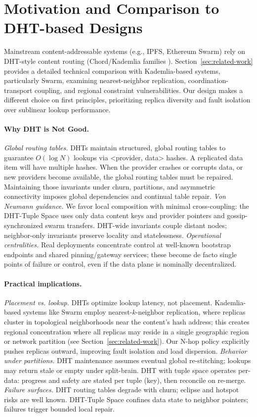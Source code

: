 \documentclass[runningheads]{llncs}
\begin{document}
\section{Motivation and Comparison to DHT-based Designs}
Mainstream content-addressable systems (e.g., IPFS, Ethereum Swarm) rely on DHT-style content routing (Chord/Kademlia families \cite{StoicaChord01}). Section~\ref{sec:related-work} provides a detailed technical comparison with Kademlia-based systems, particularly Swarm, examining nearest-neighbor replication, coordination-transport coupling, and regional constraint vulnerabilities. Our design makes a different choice on first principles, prioritizing replica diversity and fault isolation over sublinear lookup performance.

\paragraph{Why DHT is Not Good.}
\emph{Global routing tables.} DHTs maintain structured, global routing tables to guarantee $O(\log N)$ lookups via <provider, data> hashes. A replicated data item will have multiple hashes. When the provider crashes or corrupts data, or new providers become available, the global routing tables must be repaired. Maintaining those invariants under churn, partitions, and asymmetric connectivity imposes global dependencies and continual table repair. \emph{Von Neumann guidance.} We favor local composition with minimal cross-coupling: the DHT-Tuple Space uses only data content keys and provider pointers and gossip-synchronized swarm transfers. DHT-wide invariants couple distant nodes;  neighbor-only invariants preserve locality and statelessness. \emph{Operational centralities.} Real deployments concentrate control at well-known bootstrap endpoints and shared pinning/gateway services; these become de facto single points of failure or control, even if the data plane is nominally decentralized.

\paragraph{Practical implications.}
\emph{Placement vs. lookup.} DHTs optimize lookup latency, not placement. Kademlia-based systems like Swarm employ nearest-$k$-neighbor replication, where replicas cluster in topological neighborhoods near the content's hash address; this creates regional concentration where all replicas may reside in a single geographic region or network partition (see Section~\ref{sec:related-work}). Our N-hop policy explicitly pushes replicas outward, improving fault isolation and load dispersion. \emph{Behavior under partitions.} DHT maintenance assumes eventual global re-stitching; lookups may return stale or empty under split-brain. DHT with tuple space operates per-data: progress and safety are stated per tuple (key), then reconcile on re-merge. \emph{Failure surfaces.} DHT routing tables degrade with churn; eclipse and hotspot risks are well known. DHT-Tuple Space confines data state to neighbor pointers; failures trigger bounded local repair.
\end{document}

